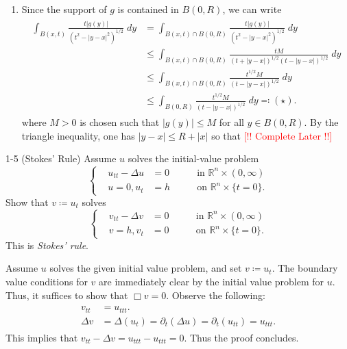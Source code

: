 \documentclass{article}
\numberwithin{equation}{section}
\begin{document}
	\begin{enumerate}[itemsep =-2pt,label = (\alph{*})]
		\item Since the support of $g$ is contained in $B(0,R)$, we can write 
		\begin{align*}
			\begin{split}
				\int_{B(x,t)}\frac{t|g(y)|}{(t^2 - |y - x|^2)^{1/2}}\;dy &= \int_{B(x, t) \cap B(0,R)}\frac{t|g(y)|}{(t^2 - |y - x|^2)^{1/2}}\;dy  \\
				&\leq \int_{B(x,t) \cap B(0,R)}\frac{tM}{(t + |y - x|)^{1/2}(t - |y - x|)^{1/2}}\;dy \\
				&\leq \int_{B(x,t) \cap B(0,R)}\frac{t^{1/2}M}{(t - |y - x|)^{1/2}}\;dy \\
				&\leq \int_{B(0,R)}\frac{t^{1/2}M}{(t - |y - x|)^{1/2}}\;dy \eqqcolon (\star). 
			\end{split}
		\end{align*}
		where $M > 0$ is chosen such that $|g(y)| \leq M$ for all $y \in B(0,R)$. By the triangle inequality, one has $|y - x| \leq R + |x|$ so that 
		\textcolor{red}{[!! Complete Later !!]}
	\end{enumerate}
	
	\begin{prb}{1-5}
		(Stokes' Rule) Assume $u$ solves the initial-value problem 
		\begin{equation*}
			\left\{
			\begin{alignedat}{3}
				&u_{tt} - \Delta u &= 0 &\qquad \text{in $\mathbb{R}^n \times (0,\infty)$} \\
				&u =0, u_t &=h &\qquad \text{on $\mathbb{R}^n \times \{t = 0\}$}.
			\end{alignedat}
			\right.
		\end{equation*}
		Show that $v \coloneqq u_t$ solves 
		\begin{equation*}
			\left\{
			\begin{alignedat}{3}
				&v_{tt} - \Delta v &= 0 &\qquad \text{in $\mathbb{R}^n \times (0,\infty)$} \\
				&v =h, v_t &= 0 &\qquad \text{on $\mathbb{R}^n \times \{t = 0\}$}.
			\end{alignedat}
			\right.
		\end{equation*}
		This is \textit{Stokes' rule}. 
	\end{prb}
	Assume $u$ solves the given initial value problem, and set $v \coloneqq u_t$. The boundary value conditions for $v$ are immediately clear by the initial value problem for $u$. Thus, it suffices to show that $\Box v = 0$. Observe the following: 
	\begin{align*}
		\begin{split}
			v_{tt} &= u_{ttt}. \\
			\Delta v &= \Delta (u_{t}) = \partial_{t}(\Delta u) = \partial_t (u_{tt}) = u_{ttt}. 
		\end{split}
	\end{align*}
	This implies that $v_{tt} - \Delta v = u_{ttt} - u_{ttt} =0$. Thus the proof concludes. 
	
\end{document}
